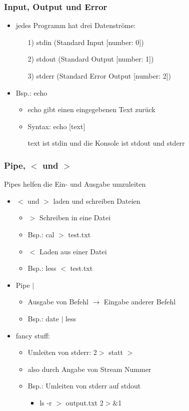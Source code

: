 \documentclass[12pt,utf8]{beamer}
\begin{document}
\begin{frame}
\frametitle{Input, Output und Error}
\begin{itemize}
	\item jedes Programm hat drei Datenströme:
	\begin{itemize}
		\item[1)] stdin (Standard Input [number: 0])
		\item[2)] stdout (Standard Output [number: 1])
		\item[3)] stderr (Standard Error Output [number: 2])
	\end{itemize}
	\item Bsp.: echo
	\begin{itemize}[<+->]
		\item echo gibt einen eingegebenen Text zurück
		\item Syntax: echo [text]
		\item [text] ist stdin und die Konsole ist stdout und stderr
	\end{itemize}
\end{itemize}
\end{frame}


\begin{frame}
\frametitle{Pipe, $<$ und $>$ }
Pipes helfen die Ein- und Ausgabe umzuleiten
\begin{itemize}[<+->]
	\item $<$ und $>$ laden und schreiben Dateien
	\begin{itemize}[<+->]
		\item $>$ Schreiben in eine Datei
		\item Bsp.: cal $>$ test.txt
		\item $<$ Laden aus einer Datei
		\item Bsp.: less $<$ test.txt
	\end{itemize}
	\item Pipe $\mid$
	\begin{itemize}[<+->]
		\item Ausgabe von Befehl $\to$ Eingabe anderer Befehl
		\item Bsp.: date $\mid$ less
	\end{itemize}
	\item fancy stuff:
	\begin{itemize}[<+->]
		\item Umleiten von stderr: 2$>$ statt $>$
		\item also durch Angabe von Stream Nummer
		\item Bsp.: Umleiten von stderr auf stdout
		\begin{itemize}
			\item ls -r $>$ output.txt 2$>\&$1 
		\end{itemize}
	\end{itemize}
\end{itemize}
\end{frame}
\end{document}
